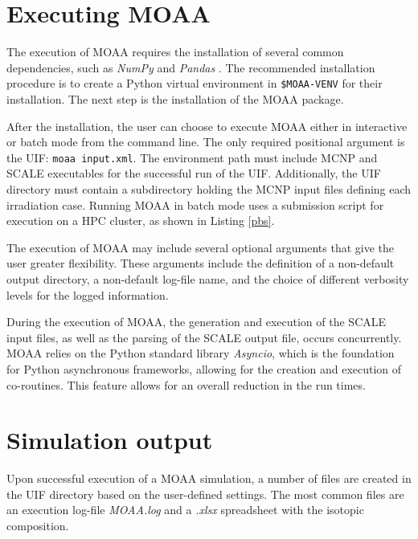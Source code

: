 \section{Executing MOAA}

The execution of MOAA requires the installation of several common dependencies, such as \textit{NumPy} \cite{numpy} and \textit{Pandas} \cite{pandas}.
The recommended installation procedure is to create a Python virtual environment in \texttt{\$MOAA-VENV} for their installation.
The next step is the installation of the MOAA package.

After the installation, the user can choose to execute MOAA either in interactive or batch mode from the command line.
The only required positional argument is the UIF: \texttt{moaa input.xml}.
The environment path must include MCNP and SCALE executables for the successful run of the UIF.
Additionally, the UIF directory must contain a subdirectory holding the MCNP input files defining each irradiation case.
Running MOAA in batch mode uses a submission script for execution on a \gls*{HPC} cluster, as shown in Listing \ref{pbs}.



The execution of MOAA may include several optional arguments that give the user greater flexibility.
These arguments include the definition of a non-default output directory, a non-default log-file name, and the choice of different verbosity levels for the logged information.

During the execution of MOAA, the generation and execution of the SCALE input files, as well as the parsing of the SCALE output file, occurs concurrently.
MOAA relies on the Python standard library \textit{Asyncio}, which is the foundation for Python asynchronous frameworks, allowing for the creation and execution of co-routines.
This feature allows for an overall reduction in the run times.


\section{Simulation output}
\label{sec:out}

Upon successful execution of a MOAA simulation, a number of files are created in the UIF directory based on the user-defined settings.
The most common files are an execution log-file \textit{MOAA.log} and a \textit{.xlsx} spreadsheet with the isotopic composition.

